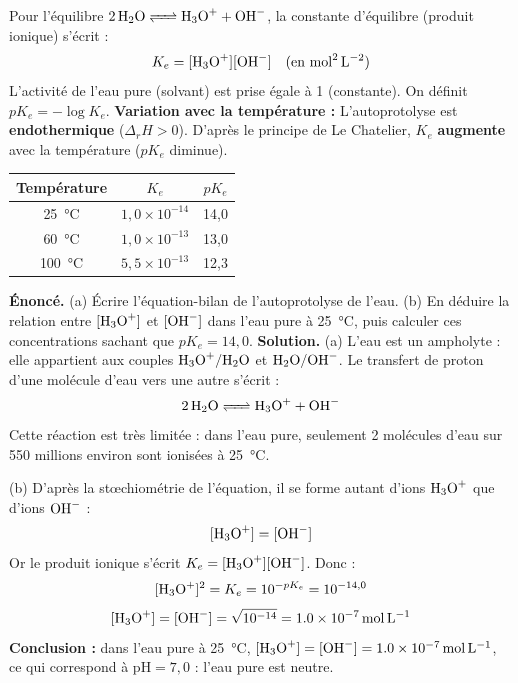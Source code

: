 \documentclass[11pt]{article}
\newcommand{\cle}[1]{{\popxbold\color{popdark}#1}}
\begin{document}
\begin{aretenir}
Pour l'équilibre $\ce{2 H2O <=> H3O+ + OH-}$, la constante d'équilibre (produit ionique) s'écrit :
\[ K_e = [\ce{H3O+}] [\ce{OH-}] \quad (\text{en } \si{mol^2.L^{-2}}) \]
L'activité de l'eau pure (solvant) est prise égale à 1 (constante).
On définit $pK_e = -\log K_e$.
\textbf{Variation avec la température :} L'autoprotolyse est \textbf{endothermique} ($\Delta_r H > 0$). D'après le principe de Le Chatelier, $K_e$ \textbf{augmente} avec la température ($pK_e$ diminue).
\begin{center}
\begin{tabular}{|c|c|c|}\hline
\rowcolor{popblueL}
\textbf{Température} & \textbf{$K_e$} & \textbf{$pK_e$} \\\hline
\SI{25}{\celsius} & $1,0 \times 10^{-14}$ & 14,0 \\\hline
\SI{60}{\celsius} & $1,0 \times 10^{-13}$ & 13,0 \\\hline
\SI{100}{\celsius} & $5,5 \times 10^{-13}$ & 12,3 \\\hline
\end{tabular}
\end{center}
\end{aretenir}

\begin{exoresolu}
\textbf{Énoncé.} (a) Écrire l'équation-bilan de l'autoprotolyse de l'eau. (b) En déduire la relation entre $[\ce{H3O+}]$ et $[\ce{OH-}]$ dans l'eau pure à \SI{25}{\celsius}, puis calculer ces concentrations sachant que $pK_e = 14{,}0$.
\tcblower
\textbf{Solution.}
(a) L'eau est un ampholyte : elle appartient aux couples $\ce{H3O+}/\ce{H2O}$ et $\ce{H2O}/\ce{OH-}$. Le transfert de proton d'une molécule d'eau vers une autre s'écrit :
\[ \ce{2 H2O <=> H3O+ + OH-} \]
Cette réaction est très limitée : dans l'eau pure, seulement 2 molécules d'eau sur 550 millions environ sont ionisées à \SI{25}{\celsius}.

(b) D'après la stœchiométrie de l'équation, il se forme autant d'ions $\ce{H3O+}$ que d'ions $\ce{OH-}$ :
\[ [\ce{H3O+}] = [\ce{OH-}] \]
Or le produit ionique s'écrit $K_e = [\ce{H3O+}][\ce{OH-}]$. Donc :
\[ [\ce{H3O+}]^2 = K_e = 10^{-pK_e} = 10^{-14{,}0} \]
\[ [\ce{H3O+}] = [\ce{OH-}] = \sqrt{10^{-14}} = \SI{1,0e-7}{mol.L^{-1}} \]
\textbf{Conclusion :} dans l'eau pure à \SI{25}{\celsius}, $[\ce{H3O+}] = [\ce{OH-}] = \SI{1,0e-7}{mol.L^{-1}}$, ce qui correspond à $\mathrm{pH} = 7{,}0$ : l'eau pure est \cle{neutre}.
\end{exoresolu}
\end{document}
